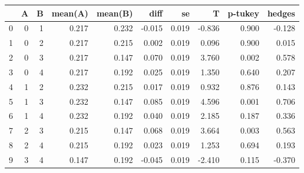\begin{tabular}{lrrrrrrrrr}
\toprule
{} &  A &  B &  mean(A) &  mean(B) &   diff &     se &      T &  p-tukey &  hedges \\
\midrule
0 &  0 &  1 &    0.217 &    0.232 & -0.015 &  0.019 & -0.836 &    0.900 &  -0.128 \\
1 &  0 &  2 &    0.217 &    0.215 &  0.002 &  0.019 &  0.096 &    0.900 &   0.015 \\
2 &  0 &  3 &    0.217 &    0.147 &  0.070 &  0.019 &  3.760 &    0.002 &   0.578 \\
3 &  0 &  4 &    0.217 &    0.192 &  0.025 &  0.019 &  1.350 &    0.640 &   0.207 \\
4 &  1 &  2 &    0.232 &    0.215 &  0.017 &  0.019 &  0.932 &    0.876 &   0.143 \\
5 &  1 &  3 &    0.232 &    0.147 &  0.085 &  0.019 &  4.596 &    0.001 &   0.706 \\
6 &  1 &  4 &    0.232 &    0.192 &  0.040 &  0.019 &  2.185 &    0.187 &   0.336 \\
7 &  2 &  3 &    0.215 &    0.147 &  0.068 &  0.019 &  3.664 &    0.003 &   0.563 \\
8 &  2 &  4 &    0.215 &    0.192 &  0.023 &  0.019 &  1.253 &    0.694 &   0.193 \\
9 &  3 &  4 &    0.147 &    0.192 & -0.045 &  0.019 & -2.410 &    0.115 &  -0.370 \\
\bottomrule
\end{tabular}
